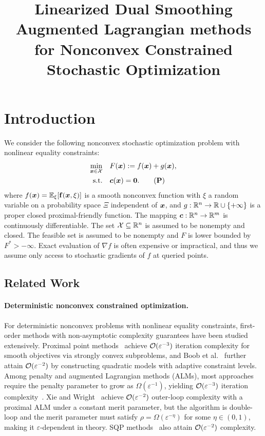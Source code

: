 \documentclass[10pt]{article}
\title{Linearized Dual Smoothing Augmented Lagrangian methods for Nonconvex Constrained Stochastic  Optimization}
\begin{document}
\maketitle

\section{Introduction}
\label{sec:intro}
We consider the following nonconvex stochastic optimization problem with
nonlinear equality constraints:
\begin{align}\label{Prob: primal problem}
    \min_{\bx \in \calX} \quad & F(\bx) := f(\bx) + g(\bx), \notag \\
    \text{s.t.} \quad & \bc(\bx) = \bm{0}. \tag{{\bf P}}
\end{align}
where $f(\bm{x}) = \mathbb{E}_{\xi}[\mathbf{f}(\bm{x},\xi)]$ is a smooth nonconvex 
function with $\xi$ a random variable on a probability space $\Xi$ independent 
of $\bm{x}$, and $g:\mathbb{R}^n\to\mathbb{R}\cup\{+\infty\}$ is a proper closed 
proximal-friendly function. The mapping $\bm{c}:\mathbb{R}^n\to\mathbb{R}^{m}$
is continuously differentiable. The set
$\mathcal{X}\subseteq\mathbb{R}^n$ is assumed to be nonempty and closed.
The feasible set is assumed to be nonempty and $F$ is lower 
bounded by $F^*>-\infty$. Exact evaluation of $\nabla f$ is often expensive or 
impractical, and thus we assume only access to stochastic gradients of $f$ at 
queried points.


\subsection{Related Work}
\label{sec:related-work}

\paragraph{Deterministic nonconvex constrained optimization.}
For deterministic nonconvex problems with nonlinear equality constraints,
first-order methods with non-asymptotic complexity guarantees have been studied
extensively.
Proximal point methods~\cite{boob2023stochastic,ma2022quadratically} achieve
$\mathcal{O}(\varepsilon^{-3})$ iteration complexity for smooth objectives via strongly
convex subproblems, and Boob et al.~\cite{boob2022level} further attain
$\mathcal{O}(\varepsilon^{-2})$ by constructing quadratic models with adaptive
constraint levels.
Among penalty and augmented Lagrangian methods (ALMs), most approaches
require the penalty parameter to grow as $\Omega(\varepsilon^{-1})$, yielding
$\mathcal{O}(\varepsilon^{-3})$ iteration complexity~\cite{li2021rate,jia2023first}.
Xie and Wright~\cite{xie2021proximal} achieve $\mathcal{O}(\varepsilon^{-2})$
outer-loop complexity with a proximal ALM under a constant merit parameter,
but the algorithm is double-loop and the merit parameter must satisfy
$\rho = \Omega(\varepsilon^{-\eta})$ for some $\eta \in (0,1)$, making it
$\varepsilon$-dependent in theory.
SQP methods~\cite{curtis2021sqp,cartis2014complexity} also attain
$\mathcal{O}(\varepsilon^{-2})$ complexity.
\end{document}
